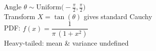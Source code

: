 \documentclass[preview]{standalone}
\begin{document}
Angle $\theta \sim \mathrm{Uniform}\!\bigl(-\tfrac{\pi}{2}, \tfrac{\pi}{2}\bigr)$\\Transform $X = \tan(\theta)$ gives standard Cauchy\\PDF: $f(x) = \dfrac{1}{\pi\,(1 + x^2)}$\\Heavy-tailed: mean & variance undefined\\
\end{document}
